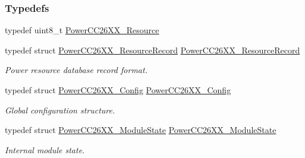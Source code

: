 \subsubsection*{Typedefs}
\begin{DoxyCompactItemize}
\item 
typedef uint8\+\_\+t \hyperlink{_power_c_c26_x_x_8h_a2e11676879f87f39c099719d717dd04e}{Power\+C\+C26\+X\+X\+\_\+\+Resource}
\item 
typedef struct \hyperlink{struct_power_c_c26_x_x___resource_record}{Power\+C\+C26\+X\+X\+\_\+\+Resource\+Record} \hyperlink{_power_c_c26_x_x_8h_a3db8eb98416a61d34aaddea9d1a67cc6}{Power\+C\+C26\+X\+X\+\_\+\+Resource\+Record}
\begin{DoxyCompactList}\small\item\em Power resource database record format. \end{DoxyCompactList}\item 
typedef struct \hyperlink{struct_power_c_c26_x_x___config}{Power\+C\+C26\+X\+X\+\_\+\+Config} \hyperlink{_power_c_c26_x_x_8h_adb528c35432da8c5cae957cdbf874740}{Power\+C\+C26\+X\+X\+\_\+\+Config}
\begin{DoxyCompactList}\small\item\em Global configuration structure. \end{DoxyCompactList}\item 
typedef struct \hyperlink{struct_power_c_c26_x_x___module_state}{Power\+C\+C26\+X\+X\+\_\+\+Module\+State} \hyperlink{_power_c_c26_x_x_8h_a2903fa8d575b7c6d33d95bd652625561}{Power\+C\+C26\+X\+X\+\_\+\+Module\+State}
\begin{DoxyCompactList}\small\item\em Internal module state. \end{DoxyCompactList}\end{DoxyCompactItemize}
